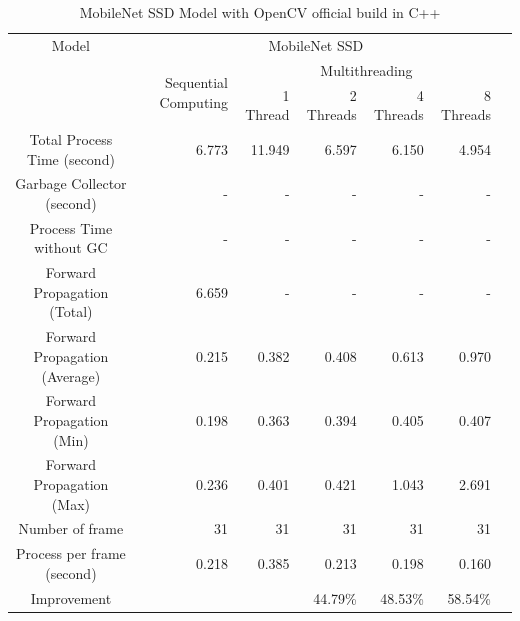             \begin{table}[!htp]\centering
                \scriptsize
                \begin{tabular}{lrrrrrrr}\toprule
                    \multicolumn{2}{c}{Model} &\multicolumn{5}{c}{MobileNet SSD} \\\cmidrule{1-7}
                    \multicolumn{2}{c}{\multirow{2}{*}{}} &\multirow{2}{*}{Sequential Computing} &\multicolumn{4}{c}{Multithreading} \\\cmidrule{4-7}
                    & & &1 Thread &2 Threads &4 Threads &8 Threads \\\midrule
                    \multicolumn{2}{c}{Total Process Time (second)} &6.773 &11.949 &6.597 &6.150 &4.954 \\
                    \multicolumn{2}{c}{Garbage Collector (second)} &- &- &- &- &- \\
                    \multicolumn{2}{c}{Process Time without GC} &- &- &- &- &- \\
                    \multicolumn{2}{c}{Forward Propagation (Total)} &6.659 &- &- &- &- \\
                    \multicolumn{2}{c}{Forward Propagation (Average)} &0.215 &0.382 &0.408 &0.613 &0.970 \\
                    \multicolumn{2}{c}{Forward Propagation (Min)} &0.198 &0.363 &0.394 &0.405 &0.407 \\
                    \multicolumn{2}{c}{Forward Propagation (Max)} &0.236 &0.401 &0.421 &1.043 &2.691 \\
                    \multicolumn{2}{c}{Number of frame} &31 &31 &31 &31 &31 \\
                    \multicolumn{2}{c}{Process per frame (second)} &0.218 &0.385 &0.213 &0.198 &0.160 \\
                    \multicolumn{2}{c}{Improvement} & & &44.79\% &48.53\% &58.54\% \\
                    \bottomrule
                \end{tabular}

                \caption{MobileNet SSD Model with OpenCV official build in C++}\label{ssd:official-performace-cpp}
            \end{table}

